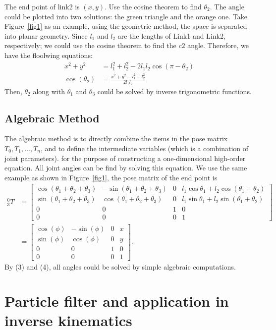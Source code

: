 \documentclass[journal,article,submit,pdftex,moreauthors]{Definitions/mdpi}
\begin{document}
The end point of link2 is $(x,y)$. Use the cosine theorem to find $\theta_2$.  The angle could be plotted into two solutions: the green triangle and the orange one. Take Figure~\ref{fig1} as an example, using the geometric method, the space is separated into planar geometry.  Since $l_1$ and $l_2$ are the  lengths of Link1 and Link2, respectively; we could use the cosine theorem to find the $c2$ angle. Therefore, we have the floolwing equations:
\begin{align} 
x^2+y^2&=l_1^2+l_2^2-2l_1l_2\cos(\pi-\theta_2) \\
\cos(\theta_2)&=\frac{x^2+y^2-l_1^2-l_2^2}{2l_1l_2}
\end{align}
Then, $\theta_2$ along with $\theta_1$ and $\theta_3$ could be solved by inverse trigonometric functions.
\subsection{Algebraic Method}
The algebraic method is to directly combine the items in the pose matrix $T_0,T_1,\ldots,T_n$, and to define the intermediate variables (which is a combination of joint parameters). for the purpose of constructing a one-dimensional high-order equation. All joint angles can be find by solving this equation. We use the same example as shown in Figure~\ref{fig1}, the pose matrix of the end point is
\begin{align}
^{0}_{3}T&=
\begin{bmatrix}
\cos(\theta_1+\theta_2+\theta_3) & -\sin(\theta_1+\theta_2+\theta_3) & 0 & l_1\cos\theta_1+l_2\cos(\theta_1+\theta_2) \\
\sin(\theta_1+\theta_2+\theta_3) & \cos(\theta_1+\theta_2+\theta_3) & 0 & l_1\sin\theta_1+l_2\sin(\theta_1+\theta_2) \\
0 & 0 & 1 & 0 \\
0 & 0 & 0 & 1 
\end{bmatrix}\\
&=
\begin{bmatrix}
\cos(\phi) & -\sin(\phi) & 0 & x \\
\sin(\phi) & \cos(\phi) & 0 & y \\
0 & 0 & 1 & 0 \\
0 & 0 & 0 & 1 
\end{bmatrix}.
\end{align}
By (3) and (4), all angles could be solved by simple algebraic computations.
\section{Particle filter and application in inverse kinematics}
\end{document}
